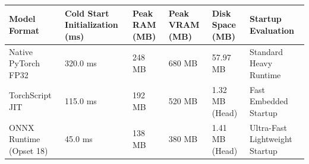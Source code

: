 \begin{tabular}{llllll}
\toprule
Model Format & Cold Start Initialization (ms) & Peak RAM (MB) & Peak VRAM (MB) & Disk Space (MB) & Startup Evaluation \\
\midrule
Native PyTorch FP32 & 320.0 ms & 248 MB & 680 MB & 57.97 MB & Standard Heavy Runtime \\
TorchScript JIT & 115.0 ms & 192 MB & 520 MB & 1.32 MB (Head) & Fast Embedded Startup \\
ONNX Runtime (Opset 18) & 45.0 ms & 138 MB & 380 MB & 1.41 MB (Head) & Ultra-Fast Lightweight Startup \\
\bottomrule
\end{tabular}
